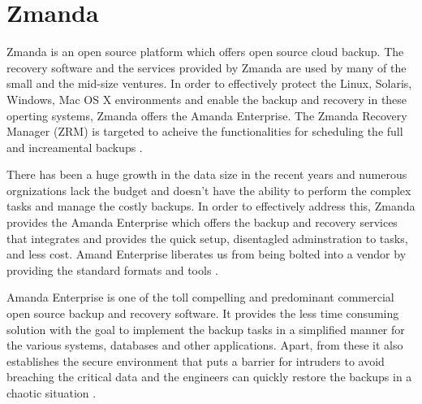 \section{Zmanda}
Zmanda is an open source platform which offers open source cloud backup. The recovery software and the services provided by Zmanda are used by many of the small and the mid-size ventures. In order to effectively protect the Linux, Solaris, Windows, Mac OS X environments and enable the backup and recovery in these operting systems, Zmanda offers the Amanda Enterprise. The Zmanda Recovery Manager (ZRM) is targeted to acheive the functionalities for scheduling the full and increamental backups \cite{hid-sp18-412-zmanda_crunchbase}. 

There has been a huge growth in the data size in the recent years and numerous orgnizations lack the budget and doesn't have the ability to perform the complex tasks and manage the 
costly backups. In order to effectively address this, Zmanda
provides the Amanda Enterprise which offers the backup and recovery services that integrates and provides the quick setup, disentagled adminstration to tasks, and less cost. Amand Enterprise liberates us from being bolted into a vendor by providing the standard formats and tools \cite{hid-sp18-412-zmanda_amanda}.

Amanda Enterprise is one of the toll compelling and predominant commercial open source backup and recovery software. It provides the less time consuming solution with the goal to implement the backup tasks in a simplified manner for the various systems, databases and other applications. Apart, from 
these it also establishes the secure environment that puts a barrier for intruders to avoid breaching the critical data and 
the engineers can quickly restore the backups in a chaotic 
situation \cite{hid-sp18-412-zmanda_webinar}.
